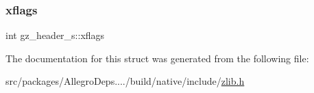 \subsubsection{\texorpdfstring{xflags}{xflags}}
{\footnotesize\ttfamily int gz\+\_\+header\+\_\+s\+::xflags}



The documentation for this struct was generated from the following file\+:\begin{DoxyCompactItemize}
\item 
src/packages/\+Allegro\+Deps..../build/native/include/\hyperlink{zlib_8h}{zlib.\+h}\end{DoxyCompactItemize}
